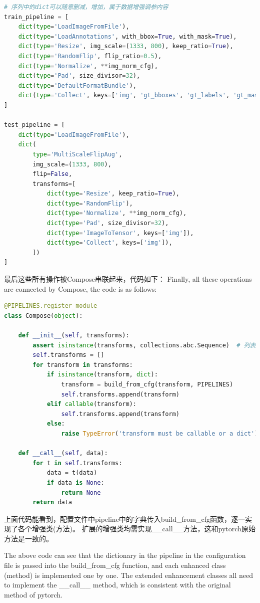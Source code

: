 \documentclass[UTF8]{ctexart}
\begin{document}
\lstset{style=mystyle}
\begin{lstlisting}[language=Python]
# 序列中的dict可以随意删减，增加，属于数据增强调参内容
train_pipeline = [
    dict(type='LoadImageFromFile'),
    dict(type='LoadAnnotations', with_bbox=True, with_mask=True),
    dict(type='Resize', img_scale=(1333, 800), keep_ratio=True),
    dict(type='RandomFlip', flip_ratio=0.5),
    dict(type='Normalize', **img_norm_cfg),
    dict(type='Pad', size_divisor=32),
    dict(type='DefaultFormatBundle'),
    dict(type='Collect', keys=['img', 'gt_bboxes', 'gt_labels', 'gt_masks']),
]

test_pipeline = [
    dict(type='LoadImageFromFile'),
    dict(
        type='MultiScaleFlipAug',
        img_scale=(1333, 800),
        flip=False,
        transforms=[
            dict(type='Resize', keep_ratio=True),
            dict(type='RandomFlip'),
            dict(type='Normalize', **img_norm_cfg),
            dict(type='Pad', size_divisor=32),
            dict(type='ImageToTensor', keys=['img']),
            dict(type='Collect', keys=['img']),
        ])
]
\end{lstlisting}
最后这些所有操作被Compose串联起来，代码如下：
Finally, all these operations are connected by Compose, the code is as follows:
\lstset{style=mystyle}
\begin{lstlisting}[language=Python]
@PIPELINES.register_module
class Compose(object):

	def __init__(self, transforms):
		assert isinstance(transforms, collections.abc.Sequence)  # 列表是序列结构
		self.transforms = []
		for transform in transforms:
			if isinstance(transform, dict):
				transform = build_from_cfg(transform, PIPELINES)
				self.transforms.append(transform)
			elif callable(transform):
				self.transforms.append(transform)
			else:
				raise TypeError('transform must be callable or a dict')

	def __call__(self, data):
		for t in self.transforms:
			data = t(data)
			if data is None:
				return None
		return data
\end{lstlisting}
上面代码能看到，配置文件中pipeline中的字典传入build\_from\_cfg函数，逐一实现了各个增强类(方法)。
扩展的增强类均需实现\_\_call\_\_方法，这和pytorch原始方法是一致的。

The above code can see that the dictionary in the pipeline in the configuration file 
is passed into the build\_from\_cfg function, and each enhanced class (method) is 
implemented one by one. The extended enhancement classes all need to implement the 
\_\_call\_\_ method, which is consistent with the original method of pytorch.
\end{document}
